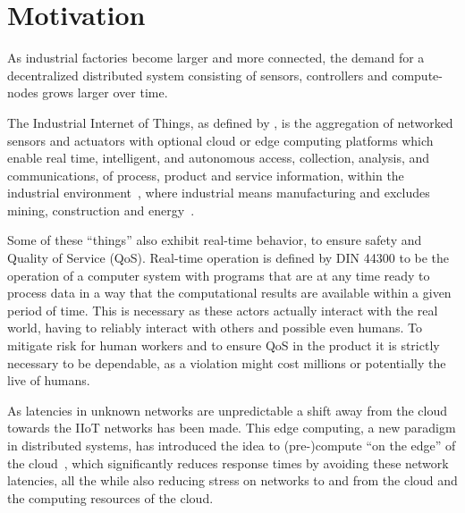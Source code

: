 \section{Motivation}


As industrial factories become larger and more connected, the demand for a
decentralized distributed system consisting of sensors, controllers and
compute-nodes grows larger over time.

The Industrial Internet of Things, as defined by
\citeauthor{boyes_industrial_2018}, is the aggregation of networked sensors and
actuators with optional cloud or edge computing platforms which enable real
time, intelligent, and autonomous access, collection, analysis, and
communications, of process, product and service information, within the
industrial environment~\cite{boyes_industrial_2018}, where industrial means
manufacturing and excludes mining, construction and
energy~\cite{noauthor_industry_nodate}.

Some of these \enquote{things} also exhibit real-time behavior, to ensure safety
and Quality of Service (QoS). Real-time operation is defined by DIN 44300 to be
the operation of a computer system with programs that are at any time ready to
process data in a way that the computational results are available within a
given period of time. This is necessary as these actors actually interact with
the real world, having to reliably interact with others and possible even
humans. To mitigate risk for human workers and to ensure QoS in the product it
is strictly necessary to be dependable, as a violation might cost millions or
potentially the live of humans.


As latencies in unknown networks are unpredictable a shift away from the cloud
towards the IIoT networks has been made. This edge computing, a new paradigm in
distributed systems, has introduced the idea to (pre-)compute \enquote{on the
edge} of the cloud~\cite{shi_edge_2016}, which significantly reduces response
times by avoiding these network latencies, all the while also reducing stress on
networks to and from the cloud and the computing resources of the cloud.

